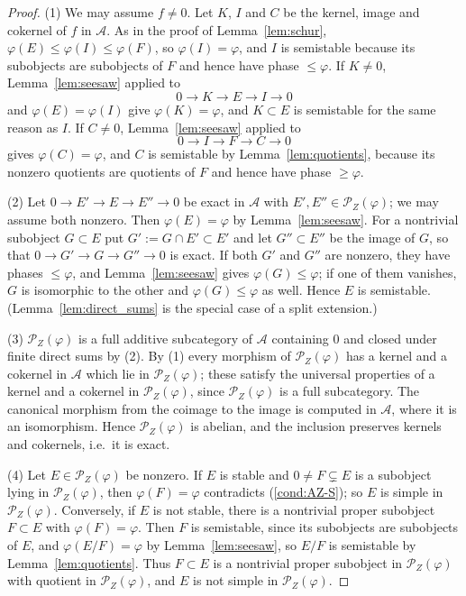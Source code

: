\documentclass[12pt]{amsart}
\newcommand{\condref}[1]{\textup{(\ref{#1})}}
\numberwithin{theorem}{section}
\theoremstyle{definition}
\newcommand{\calA}{\mathcal{A}}
\newcommand{\calP}{\mathcal{P}}
\begin{document}
	\begin{proof}
		(1) We may assume $f \neq 0$.
		Let $K$, $I$ and $C$ be the kernel, image and cokernel of $f$ in $\calA$.
		As in the proof of Lemma~\ref{lem:schur}, $\varphi(E) \leqslant \varphi(I) \leqslant \varphi(F)$, so $\varphi(I) = \varphi$, and $I$ is semistable because its subobjects are subobjects of $F$ and hence have phase $\leqslant \varphi$.
		If $K \neq 0$, Lemma~\ref{lem:seesaw} applied to
		\[
		0 \to K \to E \to I \to 0
		\]
		and $\varphi(E) = \varphi(I)$ give $\varphi(K) = \varphi$, and $K \subset E$ is semistable for the same reason as $I$.
		If $C \neq 0$, Lemma~\ref{lem:seesaw} applied to
		\[
		0 \to I \to F \to C \to 0
		\]
		gives $\varphi(C) = \varphi$, and $C$ is semistable by Lemma~\ref{lem:quotients}, because its nonzero quotients are quotients of $F$ and hence have phase $\geqslant \varphi$.

		(2) Let $0 \to E' \to E \to E'' \to 0$ be exact in $\calA$ with $E', E'' \in \calP_Z(\varphi)$; we may assume both nonzero.
		Then $\varphi(E) = \varphi$ by Lemma~\ref{lem:seesaw}.
		For a nontrivial subobject $G \subset E$ put $G' := G \cap E' \subset E'$ and let $G'' \subset E''$ be the image of $G$, so that $0 \to G' \to G \to G'' \to 0$ is exact.
		If both $G'$ and $G''$ are nonzero, they have phases $\leqslant \varphi$, and Lemma~\ref{lem:seesaw} gives $\varphi(G) \leqslant \varphi$;
		if one of them vanishes, $G$ is isomorphic to the other and $\varphi(G) \leqslant \varphi$ as well.
		Hence $E$ is semistable.
		(Lemma~\ref{lem:direct_sums} is the special case of a split extension.)

		(3) $\calP_Z(\varphi)$ is a full additive subcategory of $\calA$ containing $0$ and closed under finite direct sums by (2).
		By (1) every morphism of $\calP_Z(\varphi)$ has a kernel and a cokernel in $\calA$ which lie in $\calP_Z(\varphi)$;
		these satisfy the universal properties of a kernel and a cokernel in $\calP_Z(\varphi)$, since $\calP_Z(\varphi)$ is a full subcategory.
		The canonical morphism from the coimage to the image is computed in $\calA$, where it is an isomorphism.
		Hence $\calP_Z(\varphi)$ is abelian, and the inclusion preserves kernels and cokernels, i.e.\ it is exact.

		(4) Let $E \in \calP_Z(\varphi)$ be nonzero.
		If $E$ is stable and $0 \neq F \subsetneq E$ is a subobject lying in $\calP_Z(\varphi)$, then $\varphi(F) = \varphi$ contradicts \condref{cond:AZ-S}; so $E$ is simple in $\calP_Z(\varphi)$.
		Conversely, if $E$ is not stable, there is a nontrivial proper subobject $F \subset E$ with $\varphi(F) = \varphi$.
		Then $F$ is semistable, since its subobjects are subobjects of $E$, and $\varphi(E / F) = \varphi$ by Lemma~\ref{lem:seesaw}, so $E / F$ is semistable by Lemma~\ref{lem:quotients}.
		Thus $F \subset E$ is a nontrivial proper subobject in $\calP_Z(\varphi)$ with quotient in $\calP_Z(\varphi)$, and $E$ is not simple in $\calP_Z(\varphi)$.
	\end{proof}
\end{document}
